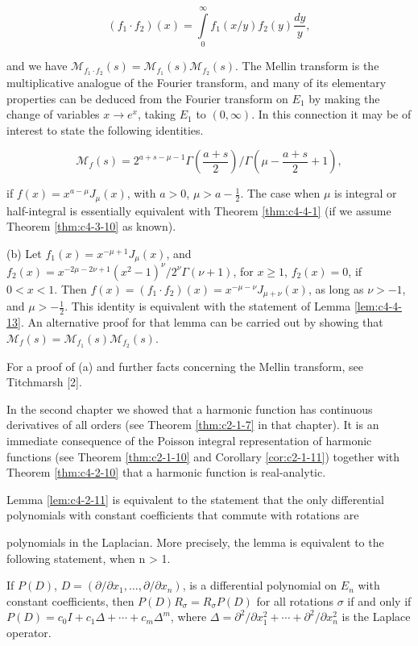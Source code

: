 \[
(f_{1}\cdot f_{2})(x)=\int\limits_{0}^{\infty}f_{1}(x/y)f_{2}(y)\frac{dy}{y},
\]

and we have $\mathcal{M}_{f_1 \cdot f_2}(s) = \mathcal{M}_{f_1}(s) \mathcal{M}_{f_2}(s)$. The Mellin transform is the multiplicative analogue of the Fourier transform, and many of its elementary properties can be deduced from the Fourier transform on $E_1$ by making the change of variables $x \to e^x$, taking $E_1$ to $(0, \infty)$. In this connection it may be of interest to state the following identities.

\begin{equation}
\tag{a}
\mathcal{M}_{f}(s)=2^{a+s-\mu-1}\Gamma\left(\frac{a+s}{2}\right)\bigg/\Gamma\left(\mu-\frac{a+s}{2}+1\right),
\end{equation}

if $f(x) = x^{a-\mu}J_\mu(x)$, with $a > 0$, $\mu > a - \frac{1}{2}$. The case when $\mu$ is integral or half-integral is essentially equivalent with Theorem \ref{thm:c4-4-1} (if we assume Theorem \ref{thm:c4-3-10} as known).

(b) Let $f_1(x) = x^{-\mu + 1} J_\mu(x)$, and $f_2(x) = x^{-2\mu - 2\nu + 1} (x^2 - 1)^\nu / 2^\nu \Gamma(\nu + 1)$, for $x \geq 1$, $f_2(x) = 0$, if $0 < x < 1$. Then $f(x) = (f_1 \cdot f_2)(x) = x^{-\mu - \nu} J_{\mu + \nu}(x)$, as long as $\nu > -1$, and $\mu > -\frac{1}{2}$. This identity is equivalent with the statement of Lemma \ref{lem:c4-4-13}. An alternative proof for that lemma can be carried out by showing that $\mathcal{M}_f(s) = \mathcal{M}_{f_1}(s) \mathcal{M}_{f_2}(s)$.

For a proof of (a) and further facts concerning the Mellin transform, see Titchmarsh [2].

 In the second chapter we showed that a harmonic function has continuous derivatives of all orders (see Theorem \ref{thm:c2-1-7} in that chapter). It is an immediate consequence of the Poisson integral representation of harmonic functions (see Theorem \ref{thm:c2-1-10} and Corollary \ref{cor:c2-1-11}) together with Theorem \ref{thm:c4-2-10} that a harmonic function is real-analytic.

 Lemma \ref{lem:c4-2-11} is equivalent to the statement that the only differential polynomials with constant coefficients that commute with rotations are

polynomials in the Laplacian. More precisely, the lemma is equivalent to the following statement, when n > 1.

If $P(D)$, $D = (\partial/\partial x_1, \ldots, \partial/\partial x_n)$, is a differential polynomial on $E_n$ with constant coefficients, then $P(D)R_\sigma = R_\sigma P(D)$ for all rotations $\sigma$ if and only if $P(D) = c_0I + c_1\Delta + \cdots + c_m\Delta^m$, where $\Delta = \partial^2/\partial x_1^2 + \cdots + \partial^2/\partial x_n^2$ is the Laplace operator.

